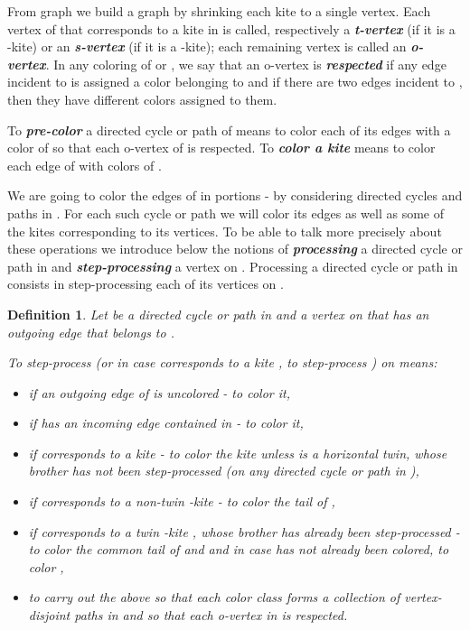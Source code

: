 \documentclass[a4, 11pt]{article}
\newcommand{\<}{\langle}
\renewcommand{\>}{\rangle}
\newtheorem{definition}{Definition}
\begin{document}
From graph  we build a graph  by shrinking each kite to a single vertex. Each vertex of  that corresponds to a kite in  is called, respectively a {\bf \em t-vertex} (if it is a -kite) or an {\bf \em s-vertex} (if it is a -kite); each remaining vertex is called an {\bf \em o-vertex}.  In any coloring of  or , we say that an o-vertex  is {\bf \em respected} if any edge incident to   is assigned a color belonging to  and if there are two edges incident to , then they have different colors assigned to them.

To {\bf \em pre-color} a  directed cycle  or path  of  means to
color each of its edges with a color of  so that each o-vertex of  is respected.  To {\bf \em color a kite } means to  color each edge  of  with  colors of . 

We are going to color the edges of  in portions - by considering directed cycles and paths in . For each such cycle or path we will color its edges as well as some of the kites corresponding to its vertices. To be able to talk more precisely about these operations we introduce below the notions of {\bf \em processing} a directed cycle or path  in  and {\bf \em step-processing} a vertex  on .
Processing a directed cycle or path  in  consists in step-processing each of its vertices on .


\begin{definition}
Let  be a directed cycle or path in  and
  a vertex on   that has an outgoing edge that belongs to .


To {\em step-process}  (or in case  corresponds to a kite , to step-process ) {\em on } means: 
\begin{itemize}
\item if an outgoing edge of  is uncolored - to color it,
\item if  has  an incoming edge contained in  - to color it,
\item if  corresponds to a kite  -  to color the kite  unless  is a horizontal twin, whose brother has not been step-processed (on any directed cycle or path in ),
\item if  corresponds to a non-twin -kite  -  to color the tail of ,
\item if   corresponds to a twin -kite , whose brother  has already been step-processed - to color the common tail of  and  and in case  has not already been colored, to color ,
\item to carry out the above so that each color class forms a collection of vertex-disjoint paths in  and so that each o-vertex in  is respected.
\end{itemize}
\end{definition}
\end{document}
